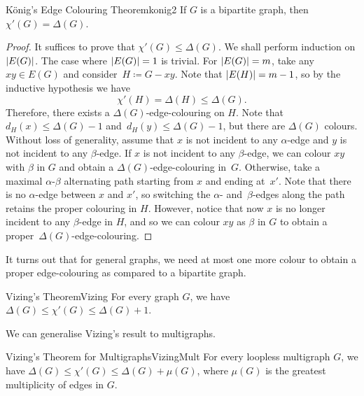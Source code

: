 \documentclass[math]{amznotes}
\theoremstyle{remark}
\newcommand{\0}{\mathbf{0}}
\newcommand{\1}{\mathbf{1}}
\begin{document}
\begin{thmbox}{K\"{o}nig's Edge Colouring Theorem}{konig2}
    If $G$ is a bipartite graph, then $\chi'(G) = \Delta(G)$.
    \tcblower
    \begin{proof}
        It suffices to prove that $\chi'(G) \leq \Delta(G)$. We shall perform induction on ${\left\lvert {E(G)} \right\rvert}$. The case where ${\left\lvert {E(G)} \right\rvert} = 1$ is trivial. For ${\left\lvert {E(G)} \right\rvert} = m$, take any $xy \in E(G)$ and consider~$H \coloneqq G - xy$. Note that ${\left\lvert {E(H)} \right\rvert} = m - 1$, so by the inductive hypothesis we have 
        \begin{equation*}
            \chi'(H) = \Delta(H) \leq \Delta(G).
        \end{equation*}
        Therefore, there exists a $\Delta(G)$-edge-colouring on $H$. Note that $d_H(x) \leq \Delta(G) - 1$ and~$d_H(y) \leq \Delta(G) - 1$, but there are $\Delta(G)$ colours. Without loss of generality, assume that $x$ is not incident to any $\alpha$-edge and $y$ is not incident to any $\beta$-edge. If $x$ is not incident to any $\beta$-edge, we can colour $xy$ with $\beta$ in $G$ and obtain a $\Delta(G)$-edge-colouring in~$G$. Otherwise, take a maximal $\alpha$-$\beta$ alternating path starting from $x$ and ending at~$x'$. Note that there is no $\alpha$-edge between $x$ and $x'$, so switching the $\alpha$- and~$\beta$-edges along the path retains the proper colouring in $H$. However, notice that now $x$ is no longer incident to any $\beta$-edge in $H$, and so we can colour $xy$ as $\beta$ in $G$ to obtain a proper~$\Delta(G)$-edge-colouring.
    \end{proof}
\end{thmbox}
It turns out that for general graphs, we need at most one more colour to obtain a proper edge-colouring as compared to a bipartite graph.
\begin{thmbox}{Vizing's Theorem}{Vizing}
    For every graph $G$, we have $\Delta(G) \leq \chi'(G) \leq \Delta(G) + 1$.
\end{thmbox}
We can generalise Vizing's result to multigraphs.
\begin{corbox}{Vizing's Theorem for Multigraphs}{VizingMult}
    For every loopless multigraph $G$, we have $\Delta(G) \leq \chi'(G) \leq \Delta(G) + \mu(G)$, where $\mu(G)$ is the greatest multiplicity of edges in $G$.
\end{corbox}
\end{document}
